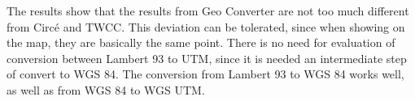 \begin{figure}[ht!]
\end{figure}


\begin{figure}[ht!]
\end{figure}

 The results show that the results from Geo Converter are not too much different from Circ\'e and TWCC. This deviation can be tolerated, since when showing on the map, they are basically the same point.
There is no need for evaluation of conversion between Lambert 93 to UTM, since it is needed an intermediate step of convert to WGS 84. The conversion from Lambert 93 to WGS 84 works well, as well as from WGS 84 to WGS UTM. 


